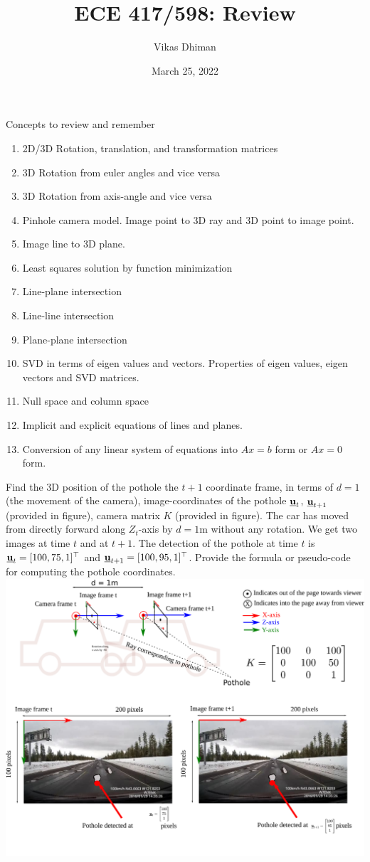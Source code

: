 \documentclass[times,t]{beamer}
\title{ECE 417/598: Review}
\author{Vikas Dhiman}
\date{March 25, 2022}
\begin{document}
\newcommand{\ubfu}{\underline{\bfu}}
\newcommand{\ubfx}{\underline{\bfx}}
\begin{frame}
  \titlepage
\end{frame}

\begin{frame}{Concepts to review and remember}
  \begin{enumerate}
    \item 2D/3D Rotation, translation, and transformation matrices
    \item 3D Rotation from euler angles and vice versa
    \item 3D Rotation from axis-angle and vice versa
    \item Pinhole camera model. Image point to 3D ray and 3D point to image point.
    \item Image line to 3D plane.
    \item Least squares solution by function minimization
    \item Line-plane intersection
    \item Line-line intersection
    \item Plane-plane intersection
    \item SVD in terms of eigen values and vectors. Properties of eigen values,
      eigen vectors and SVD matrices.
    \item Null space and column space
    \item Implicit and explicit equations of lines and planes.
    \item Conversion of any linear system of equations into $Ax = b$ form or $Ax
      = 0$ form.
  \end{enumerate}
\end{frame}

\begin{frame}{}
  Find the 3D position of the
  pothole the $t+1$ coordinate frame, in terms of $d = 1$ (the movement of the camera),
  image-coordinates of the pothole $\underline{\mathbf{u}}_t$, $\underline{\mathbf{u}}_{t+1}$ (provided in figure), camera matrix $K$ (provided in figure).
  The car has moved from directly forward along $Z_t$-axis by $d=1$m without any rotation.
  We get two images at time $t$ and at $t+1$. The detection of the pothole at
  time $t$ is $\underline{\mathbf{u}}_t = [100, 75, 1]^\top$ and
  $\underline{\mathbf{u}}_{t+1} = [100, 95, 1]^\top$.
  Provide the formula or pseudo-code for computing the
  pothole coordinates. 
  \includegraphics[width=0.7\linewidth]{media/image-road-triangulation-ray-ray.pdf}
\end{frame}
\end{document}
